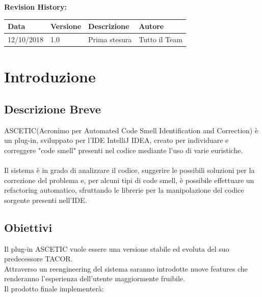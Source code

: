 	\textbf{Revision History:}
	\begin{table}[h]
		\centering
		\begin{tabularx}{0.9\textwidth}{|p{2cm}|l|X|p{3cm}|}
			\hline
			\textbf{Data} & \textbf{Versione} & \textbf{Descrizione} & \textbf{Autore} \\ \hline
			12/10/2018 & 1.0 & Prima stesura & Tutto il Team \\ \hline
		\end{tabularx}
	\end{table}

	\vfill
	\newpage
	
	\tableofcontents
	\newpage
	
		
	\section{Introduzione}
	
	\subsection{Descrizione Breve}
	
	ASCETIC(Acronimo per Automated Code Smell Identification and Correction) è un plug-in, sviluppato per l'IDE IntelliJ IDEA, creato per individuare e correggere "code smell" presenti nel codice mediante l'uso di varie euristiche.\\\\
	Il sistema è in grado di analizzare il codice, suggerire le possibili soluzioni per la correzione del problema e, per alcuni tipi di  code smell, è possibile effettuare un refactoring automatico, sfruttando le librerie per la manipolazione del codice sorgente presenti nell'IDE.
	
	\subsection{Obiettivi}
	
	Il plug-in ASCETIC vuole essere una versione stabile ed evoluta del suo predecessore TACOR.\\
	Attraverso un reengineering del sistema saranno introdotte nuove features che renderanno l'esperienza dell'utente maggiormente fruibile.\\
	
	Il prodotto finale implementerà:
	

